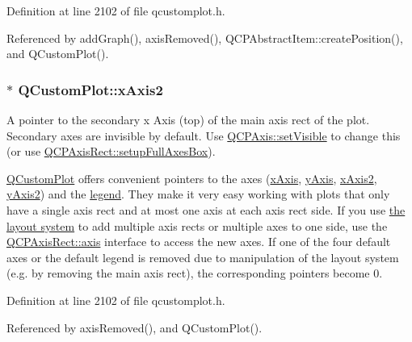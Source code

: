 Definition at line 2102 of file qcustomplot.\+h.



Referenced by add\+Graph(), axis\+Removed(), Q\+C\+P\+Abstract\+Item\+::create\+Position(), and Q\+Custom\+Plot().

\hypertarget{class_q_custom_plot_ada41599f22cad901c030f3dcbdd82fd9}{}
\subsubsection[{x\+Axis2}]{ $\ast$ Q\+Custom\+Plot\+::x\+Axis2}\label{class_q_custom_plot_ada41599f22cad901c030f3dcbdd82fd9}
A pointer to the secondary x Axis (top) of the main axis rect of the plot. Secondary axes are invisible by default. Use \hyperlink{class_q_c_p_layerable_a3bed99ddc396b48ce3ebfdc0418744f8}{Q\+C\+P\+Axis\+::set\+Visible} to change this (or use \hyperlink{class_q_c_p_axis_rect_a5fa906175447b14206954f77fc7f1ef4}{Q\+C\+P\+Axis\+Rect\+::setup\+Full\+Axes\+Box}).

\hyperlink{class_q_custom_plot}{Q\+Custom\+Plot} offers convenient pointers to the axes (\hyperlink{class_q_custom_plot_a9a79cd0158a4c7f30cbc702f0fd800e4}{x\+Axis}, \hyperlink{class_q_custom_plot_af6fea5679725b152c14facd920b19367}{y\+Axis}, \hyperlink{class_q_custom_plot_ada41599f22cad901c030f3dcbdd82fd9}{x\+Axis2}, \hyperlink{class_q_custom_plot_af13fdc5bce7d0fabd640f13ba805c0b7}{y\+Axis2}) and the \hyperlink{class_q_custom_plot_a4eadcd237dc6a09938b68b16877fa6af}{legend}. They make it very easy working with plots that only have a single axis rect and at most one axis at each axis rect side. If you use \hyperlink{}{the layout system} to add multiple axis rects or multiple axes to one side, use the \hyperlink{class_q_c_p_axis_rect_a560de44e47a4af0f86c59102a094b1e4}{Q\+C\+P\+Axis\+Rect\+::axis} interface to access the new axes. If one of the four default axes or the default legend is removed due to manipulation of the layout system (e.\+g. by removing the main axis rect), the corresponding pointers become 0. 

Definition at line 2102 of file qcustomplot.\+h.



Referenced by axis\+Removed(), and Q\+Custom\+Plot().

\hypertarget{class_q_custom_plot_af6fea5679725b152c14facd920b19367}{}
